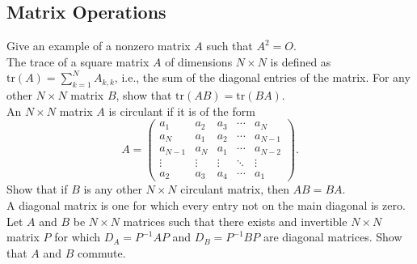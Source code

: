 \documentclass[a4paper,11pt]{article}
\begin{document}
\subsection*{Matrix Operations}

 Give an example of a nonzero matrix $A$ such
that $A^2=O$. \\

 The trace of a square matrix $A$ of dimensions
$N \times N$ is defined as $\text{tr}(A)=\sum_{k=1}^NA_{k,k}$, i.e., the sum of
the diagonal entries of the matrix. For any other $N \times N$ matrix $B$, show
that $\text{tr}(AB)=\text{tr}(BA)$. \\

 An $N \times N$ matrix $A$ is circulant if it is
of the form
\[
  A=\begin{pmatrix}
      a_1 & a_2 & a_3 & \cdots & a_N \\
      a_N & a_1 & a_2 & \cdots & a_{N-1} \\
      a_{N-1} & a_N & a_1 & \cdots & a_{N-2} \\
      \vdots & \vdots & \vdots & \ddots & \vdots \\
      a_2 & a_3 & a_4 & \cdots & a_1
    \end{pmatrix}.
\]
Show that if $B$ is any other $N \times N$ circulant matrix, then $AB=BA$. \\

 A diagonal matrix is one for which every entry
not on the main diagonal is zero. Let $A$ and $B$ be $N \times N$ matrices such
that there exists and invertible $N \times N$ matrix $P$ for which
$D_A=P^{-1}AP$ and $D_B=P^{-1}BP$ are diagonal matrices. Show that $A$ and $B$
commute.
\end{document}
